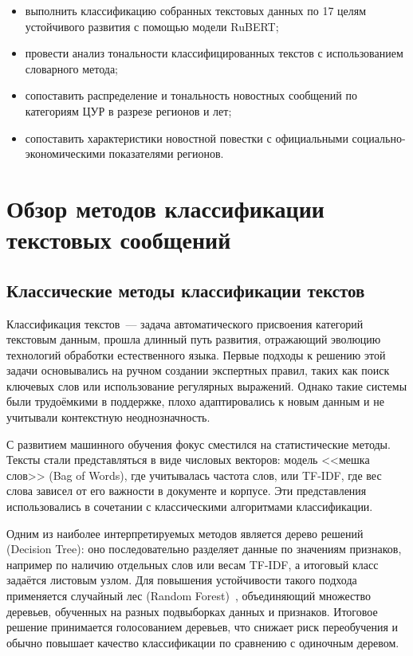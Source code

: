 \documentclass[master, och, coursework]{SCWorks1}
\begin{document}
\begin{itemize}
	\item выполнить классификацию собранных текстовых данных по 17 целям устойчивого развития с помощью модели RuBERT;
	\item провести анализ тональности классифицированных текстов с использованием словарного метода;
	\item сопоставить распределение и тональность новостных сообщений по категориям ЦУР в разрезе регионов и лет;
	\item сопоставить характеристики новостной повестки с официальными социально-экономическими показателями регионов.
\end{itemize}


\section{Обзор методов классификации текстовых сообщений}
	
\subsection{Классические методы классификации текстов}
	
Классификация текстов~--- задача автоматического присвоения категорий текстовым данным, прошла длинный путь развития, отражающий эволюцию технологий обработки естественного языка. Первые подходы к решению этой задачи основывались на ручном создании экспертных правил, таких как поиск ключевых слов или использование регулярных выражений. Однако такие системы были трудоёмкими в поддержке, плохо адаптировались к новым данным и не учитывали контекстную неоднозначность.

С развитием машинного обучения фокус сместился на статистические методы. Тексты стали представляться в виде числовых векторов: модель <<мешка слов>> (Bag of Words), где учитывалась частота слов, или TF-IDF, где вес слова зависел от его важности в документе и корпусе. Эти представления использовались в сочетании с классическими алгоритмами классификации.

Одним из наиболее интерпретируемых методов является дерево решений (Decision Tree): оно последовательно разделяет данные по значениям признаков, например по наличию отдельных слов или весам TF-IDF, а итоговый класс задаётся листовым узлом. Для повышения устойчивости такого подхода применяется случайный лес (Random Forest)~\cite{Breiman2001}, объединяющий множество деревьев, обученных на разных подвыборках данных и признаков. Итоговое решение принимается голосованием деревьев, что снижает риск переобучения и обычно повышает качество классификации по сравнению с одиночным деревом.
\end{document}
